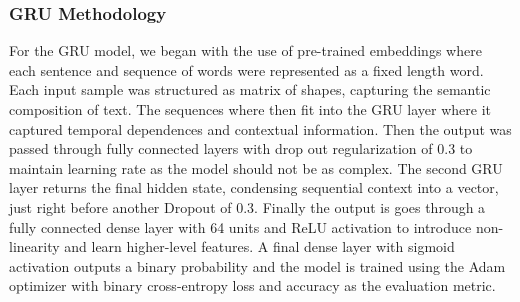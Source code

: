 \subsubsection{GRU Methodology}
\label{sec:gru}
For the GRU model, we began with the use of pre-trained embeddings where each sentence and sequence of words were represented as a fixed length word. Each input sample was structured as matrix of shapes, capturing the semantic composition of text. The sequences where then fit into the GRU layer where it captured temporal dependences and contextual information. Then the output was passed through fully connected layers with drop out regularization of 0.3 to maintain learning rate as the model should not be as complex. The second GRU layer returns the final hidden state, condensing sequential context into a vector, just right before another Dropout of 0.3.  Finally the output is goes through a fully connected dense layer with 64 units and ReLU activation to introduce non-linearity and learn higher-level features. A final dense layer with sigmoid activation outputs a binary probability and the model is trained using the Adam optimizer with binary cross-entropy loss and accuracy as the evaluation metric.